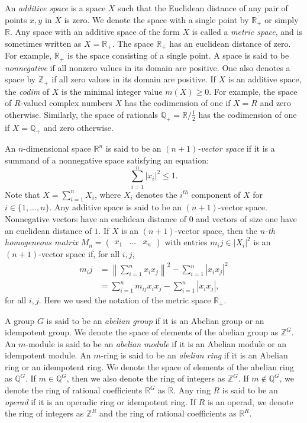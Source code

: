 \documentclass[a4paper,reqno,oneside]{article}
\begin{document}
An \textit{additive space} is a space $X$ such that the Euclidean distance of any pair of points $x, y$ in $X$ is zero. We denote the space with a single point by $\mathbb{R}_+$ or simply $\mathbb{R}$. Any space with an additive space of the form $X$ is called a \textit{metric space}, and is sometimes written as $X = \mathbb{R}_+$. The space $\mathbb{R}_+$ has an euclidean distance of zero. For example, $\mathbb{R}_+$ is the space consisting of a single point. A space is said to be \textit{nonnegative} if all nonzero values in its domain are positive. One also denotes a space by $\mathbb{Z}_+$ if all zero values in its domain are positive. If $X$ is an additive space, the \textit{codim} of $X$ is the minimal integer value $m(X) \geq 0$. For example, the space of $R$-valued complex numbers $X$ has the codimension of one if $X = R$ and zero otherwise. Similarly, the space of rationals $\mathbb{Q}_+ = \mathbb{R}/\frac{1}{2}$ has the codimension of one if $X = \mathbb{Q}_+$ and zero otherwise.

An $n$-dimensional space $\mathbb{R}^n$ is said to be an \textit{$(n+1)$-vector space} if it is a summand of a nonnegative space satisfying an equation:
\[
\sum_{i=1}^n |x_i|^2 \leq 1.
\]
Note that $X = \sum_{i=1}^n X_i$, where $X_i$ denotes the $i^{th}$ component of $X$ for $i \in \{1,..., n\}$. Any additive space is said to be an $(n+1)$-vector space. Nonnegative vectors have an euclidean distance of $0$ and vectors of size one have an euclidean distance of $1$. If $X$ is an $(n+1)$-vector space, then the \textit{$n$-th homogeneous matrix} $M_n = \begin{pmatrix} x_1 & \dots & x_n \end{pmatrix}$ with entries $m_ij \in |X_i|^2$ is an $(n+1)$-vector space if, for all $i, j$,
\begin{align}
    m_ij &= \left \| \sum_{i=1}^n x_ix_j \right \|^2 - \sum_{i=1}^n |x_ix_j|^2\\
            &= \sum_{i=1}^n m_{ij} x_ix_j - \sum_{i=1}^n |x_ix_j|,
\end{align}
for all $i, j$.
%
Here we used the notation of the metric space $\mathbb{R}_+$.

A group $G$ is said to be an \textit{abelian group} if it is an Abelian group or an idempotent group. We denote the space of elements of the abelian group as $\mathbb{Z}^G$. An $m$-module is said to be an \textit{abelian module} if it is an Abelian module or an idempotent module.  An $m$-ring is said to be an \textit{abelian ring} if it is an Abelian ring or an idempotent ring. We denote the space of elements of the abelian ring as $\mathbb{Q}^G$. If $m \in \mathbb{Q}^G$, then we also denote the ring of integers as $\mathbb{Z}^G$. If $m \not \in \mathbb{Q}^G$, we denote the ring of rational coefficients $\mathbb{R}^G$ as $\mathbb{R}$. Any ring $R$ is said to be an \textit{operad} if it is an operadic ring or idempotent ring. If $R$ is an operad, we denote the ring of integers as $\mathbb{Z}^R$ and the ring of rational coefficients as $\mathbb{R}^R$.
\end{document}
